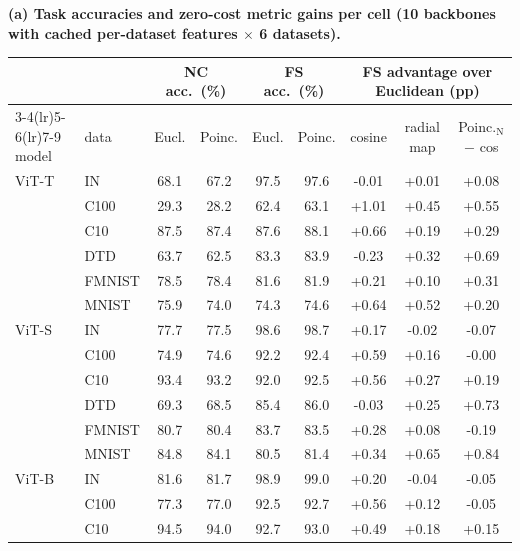 \begin{table}[H]
\centering
\scriptsize
\setlength{\tabcolsep}{2.6pt}
\begingroup
\noindent\textbf{(a) Task accuracies and zero-cost metric gains per cell (10 backbones with cached per-dataset features $\times$ 6 datasets).}\par\vspace{1.5pt}
\scriptsize\renewcommand{\arraystretch}{0.88}
\setlength{\tabcolsep}{3pt}
\begin{tabular}{llccccccc}
\toprule
 & & \multicolumn{2}{c}{NC acc.\ (\%)} & \multicolumn{2}{c}{FS acc.\ (\%)} & \multicolumn{3}{c}{FS advantage over Euclidean (pp)} \\
\cmidrule(lr){3-4}\cmidrule(lr){5-6}\cmidrule(lr){7-9}
model & data & Eucl. & Poinc. & Eucl. & Poinc. & cosine & radial map & Poinc.$_{\text{N}}$ $-$ cos \\
\midrule
ViT-T & IN & 68.1 & 67.2 & 97.5 & 97.6 & -0.01 & +0.01 & +0.08 \\
 & C100 & 29.3 & 28.2 & 62.4 & 63.1 & +1.01 & +0.45 & +0.55 \\
 & C10 & 87.5 & 87.4 & 87.6 & 88.1 & +0.66 & +0.19 & +0.29 \\
 & DTD & 63.7 & 62.5 & 83.3 & 83.9 & -0.23 & +0.32 & +0.69 \\
 & FMNIST & 78.5 & 78.4 & 81.6 & 81.9 & +0.21 & +0.10 & +0.31 \\
 & MNIST & 75.9 & 74.0 & 74.3 & 74.6 & +0.64 & +0.52 & +0.20 \\
\midrule
ViT-S & IN & 77.7 & 77.5 & 98.6 & 98.7 & +0.17 & -0.02 & -0.07 \\
 & C100 & 74.9 & 74.6 & 92.2 & 92.4 & +0.59 & +0.16 & -0.00 \\
 & C10 & 93.4 & 93.2 & 92.0 & 92.5 & +0.56 & +0.27 & +0.19 \\
 & DTD & 69.3 & 68.5 & 85.4 & 86.0 & -0.03 & +0.25 & +0.73 \\
 & FMNIST & 80.7 & 80.4 & 83.7 & 83.5 & +0.28 & +0.08 & -0.19 \\
 & MNIST & 84.8 & 84.1 & 80.5 & 81.4 & +0.34 & +0.65 & +0.84 \\
\midrule
ViT-B & IN & 81.6 & 81.7 & 98.9 & 99.0 & +0.20 & -0.04 & -0.05 \\
 & C100 & 77.3 & 77.0 & 92.5 & 92.7 & +0.56 & +0.12 & -0.05 \\
 & C10 & 94.5 & 94.0 & 92.7 & 93.0 & +0.49 & +0.18 & +0.15 \\

\end{tabular}
\end{table}
